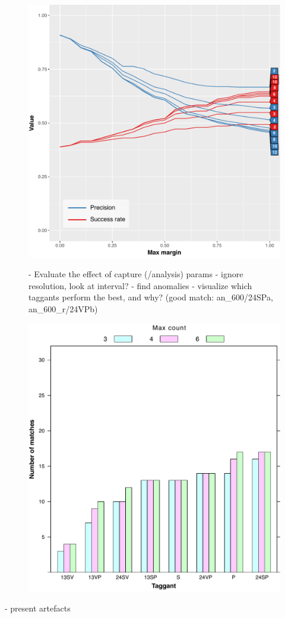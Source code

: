 \documentclass[thesis.tex]{subfiles}
\begin{document}
\begin{figure}[h]
\centering \includegraphics[page=3,width=\textwidth,height=\textheight,keepaspectratio=true]{images/experiment/match_precision}
\end{figure}
\begin{figure}[h]

- Evaluate the effect of capture (/analysis) params
  - ignore resolution, look at interval?
  - find anomalies
  - visualize which taggants perform the best, and why? (good match: an\_600/24SPa, an\_600\_r/24VPb)

\centering \includegraphics[page=7,width=\textwidth,height=\textheight,keepaspectratio=true]{images/experiment/tags_configs}
\end{figure}

- present artefacts
\end{document}
